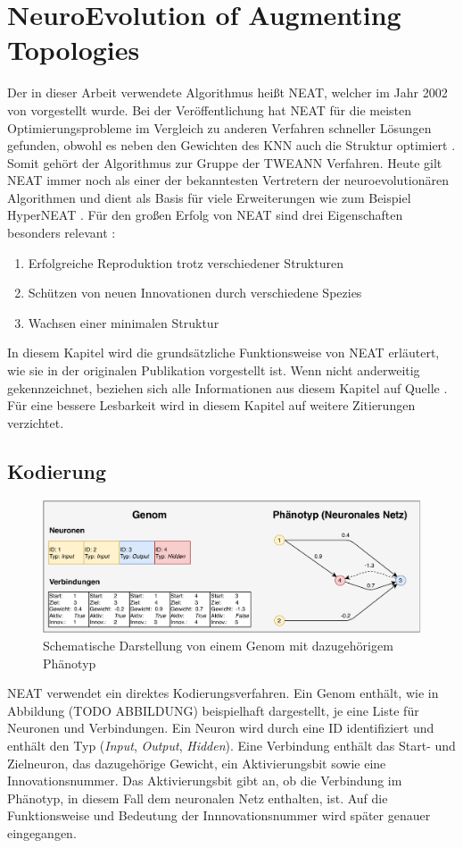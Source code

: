\section{NeuroEvolution of Augmenting Topologies}
\label{sec:neat}
Der in dieser Arbeit verwendete Algorithmus heißt \ac{NEAT}, welcher im Jahr 2002 von \citeauthor{stanley2002evolving} vorgestellt wurde. Bei der Veröffentlichung hat \ac{NEAT} für die meisten Optimierungsprobleme im Vergleich zu anderen Verfahren schneller Lösungen gefunden, obwohl es neben den Gewichten des \ac{KNN} auch die Struktur optimiert \cite{stanley2002evolving}. Somit gehört der Algorithmus zur Gruppe der \ac{TWEANN} Verfahren. Heute gilt \ac{NEAT} immer noch als einer der bekanntesten Vertretern der neuroevolutionären Algorithmen und dient als Basis für viele Erweiterungen wie zum Beispiel HyperNEAT \cite{stanley2009hyperneat}.
Für den großen Erfolg von \ac{NEAT} sind drei Eigenschaften besonders relevant \cite{stanley2002evolving}:
\begin{enumerate}
	\item Erfolgreiche Reproduktion trotz verschiedener Strukturen
	\item Schützen von neuen Innovationen durch verschiedene Spezies
	\item Wachsen einer minimalen Struktur
\end{enumerate}
In diesem Kapitel wird die grundsätzliche Funktionsweise von \ac{NEAT} erläutert, wie sie in der originalen Publikation vorgestellt ist. Wenn nicht anderweitig gekennzeichnet, beziehen sich alle Informationen aus diesem Kapitel auf Quelle \cite{stanley2002evolving}. Für eine bessere Lesbarkeit wird in diesem Kapitel auf weitere Zitierungen verzichtet.
\subsection{Kodierung}
\label{subsec:neat_encoding} %
\begin{figure}[!h]
	\centering
	\includegraphics[width=1\textwidth]{./img/neat_genome_encoding.pdf} 
	\caption{Schematische Darstellung von einem Genom mit dazugehörigem Phänotyp}
	\label{fig:neat_encoding}
\end{figure}
\ac{NEAT} verwendet ein direktes Kodierungsverfahren. Ein Genom enthält, wie in Abbildung (TODO ABBILDUNG) beispielhaft dargestellt, je eine Liste für Neuronen und Verbindungen. Ein Neuron wird durch eine ID identifiziert und enthält den Typ (\emph{Input}, \emph{Output}, \emph{Hidden}). Eine Verbindung enthält das Start- und Zielneuron, das dazugehörige Gewicht, ein Aktivierungsbit sowie eine Innovationsnummer. Das Aktivierungsbit gibt an, ob die Verbindung im Phänotyp, in diesem Fall dem neuronalen Netz enthalten, ist. Auf die Funktionsweise und Bedeutung der Innnovationsnummer wird später genauer eingegangen.
